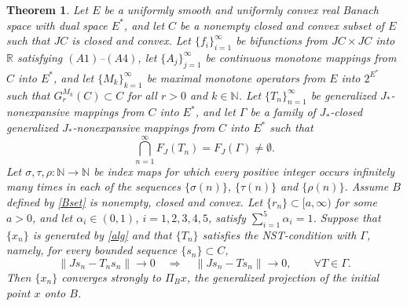\documentclass[leqno,12pt]{amsart}
\newtheorem{theorem}{Theorem}[section]
\theoremstyle{definition}
\numberwithin{equation}{section}
\begin{document}
\begin{theorem}\label{mainthm}
Let $E$ be a uniformly smooth and uniformly convex real Banach space with dual space $E^{*}$, and let $C$ be a nonempty closed and convex subset of $E$ such that $JC$ is closed and convex. Let $\{f_i\}_{i=1}^{\infty}$ be bifunctions from $JC\times JC$ into $\mathbb{R}$ satisfying $(A1)$--$(A4)$, let $\{A_j\}_{j=1}^{\infty}$ be continuous monotone mappings from $C$ into $E^{*}$, and let $\{M_k\}_{k=1}^{\infty}$ be maximal monotone operators from $E$ into $2^{E^{*}}$ such that $G_r^{M_k}(C)\subset C$ for all $r>0$ and $k\in\mathbb{N}$. Let $\{T_n\}_{n=1}^{\infty}$ be generalized $J_{*}$-nonexpansive mappings from $C$ into $E^{*}$, and let $\Gamma$ be a family of $J_{*}$-closed generalized $J_{*}$-nonexpansive mappings from $C$ into $E^{*}$ such that
\[
\bigcap_{n=1}^{\infty}F_J(T_n)=F_J(\Gamma)\neq\emptyset.
\]
Let $\sigma,\tau,\rho:\mathbb N\to\mathbb N$ be index maps for which every positive integer occurs infinitely many times in each of the sequences $\{\sigma(n)\}$, $\{\tau(n)\}$ and $\{\rho(n)\}$. Assume $B$ defined by \eqref{Bset} is nonempty, closed and convex. Let $\{r_n\}\subset [a,\infty)$ for some $a>0$, and let $\alpha_i\in(0,1)$, $i=1,2,3,4,5$, satisfy $\sum_{i=1}^{5}\alpha_i=1$. Suppose that $\{x_n\}$ is generated by \eqref{alg} and that $\{T_n\}$ satisfies the NST-condition with $\Gamma$, namely, for every bounded sequence $\{s_n\}\subset C$,
\[
\|Js_n-T_ns_n\|\to0\quad \Longrightarrow\quad \|Js_n-Ts_n\|\to0,
\qquad \forall T\in\Gamma.
\]
Then $\{x_n\}$ converges strongly to $\Pi_Bx$, the generalized projection of the initial point $x$ onto $B$.
\end{theorem}
\end{document}

